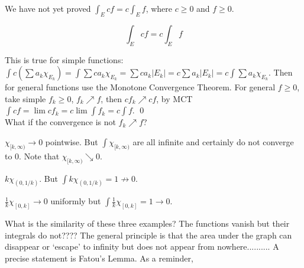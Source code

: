 













We have not yet proved $\int_E cf = c \int_E f$, where $c \geq 0$ and $f \geq 0$.

\begin{prop}
\[ \int_E cf = c \int_E f \]
\end{prop}

\pf This is true for simple functions: $\int c (\sum a_k \chi_{E_k})= \int \sum c a_k \chi_{E_k} = \sum c a_k |E_k| = c \sum a_k |E_k| = c \int \sum a_k \chi_{E_k}$. Then for general functions use the Monotone Convergence Theorem. For general $f \geq 0$, take simple $f_k \geq 0$, $f_k \nearrow f$, then $c f_k \nearrow cf$, by MCT $\int cf= \lim cf_k = c \lim \int f_k = c \int f$. \qed \\


What if the convergence is not $f_k \nearrow f$? 

\begin{ex}
$\chi_{[k,\infty)} \to 0$ pointwise. But $\int \chi_{[k,\infty)}$ are all infinite and certainly do not converge to $0$. Note that $\chi_{[k,\infty)} \searrow 0$. 
\end{ex}


\begin{ex}
$k \chi_{(0,1/k)}$. But $\int k \chi_{(0,1/k)} =1 \not\to 0$. 

\end{ex}


\begin{ex}
$\frac{1}{k} \chi_{[0,k]} \to 0$ uniformly but $\int \frac{1}{k} \chi_{[0,k]}= 1 \to 0$. 

\end{ex}


What is the similarity of these three examples? The functions vanish but their integrals do not???? The general principle is that the area under the graph can disappear or `escape' to infinity but does not appear from nowhere.......... A precise statement is Fatou's Lemma. As a reminder,


